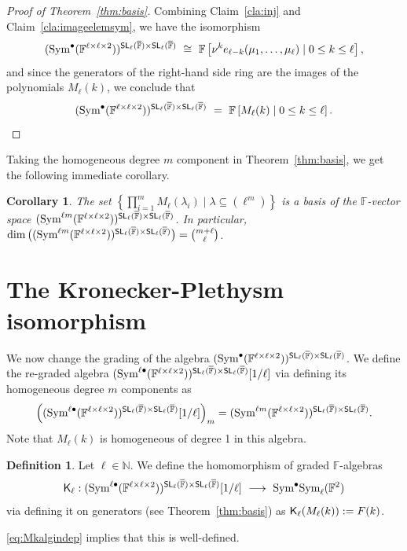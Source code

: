 \documentclass[a4paper]{extarticle}
\newcommand{\IN}{\mathbb{N}}
\newcommand{\IF}{\mathbb{F}}
\newcommand{\oIF}{{\overline{\mathbb{F}}}}
\newcommand{\SL}{\textsf{\textup{SL}}}
\newcommand{\Sym}{\textup{Sym}}
\newcommand{\KP}{\textsf{\textup{K}}}
\numberwithin{theorem}{section}
\newtheorem{corollary}[theorem]{Corollary}
\theoremstyle{definition}
\newtheorem{definition/}[theorem]{Definition}
\newenvironment{definition}
  {\renewcommand{\qedsymbol}{\scalebox{0.65}{$\blacksquare$}}
   \pushQED{\qed}\begin{definition/}}
  {\popQED\end{definition/}}
\begin{document}
\begin{proof}[Proof of Theorem~\ref{thm:basis}]
Combining Claim~\ref{cla:inj} and Claim~\ref{cla:imageelemsym}, we have the isomorphism
\[
(\Sym^{\bullet}(\IF^{\ell\times\ell\times2}))^{\SL_\ell(\oIF)\times \SL_\ell(\oIF)} \ \cong \  \IF\left[\nu^k e_{\ell-k}(\mu_1,\dots,\mu_\ell)\mid 0\leq k \leq \ell\right],
\]
and since the generators of the right-hand side ring are the images of the polynomials $M_\ell(k)$, we conclude that
\[
(\Sym^{\bullet}(\IF^{\ell\times\ell\times2}))^{\SL_\ell(\oIF)\times \SL_\ell(\oIF)}
 \ = \ 
\IF\left[M_\ell(k)\mid 0\leq k \leq \ell\right].
\qedhere
\]
\end{proof}

Taking the homogeneous degree $m$ component in Theorem~\ref{thm:basis}, we get the following immediate corollary.
\begin{corollary}
\label{cor:basiscount}
The set 
$
\left\{ \prod_{i=1}^m M_\ell(\lambda_i)\mid \lambda \subseteq (\ell^m) \right\}
$
is a basis of the
$\IF$-vector space $(\Sym^{\ell m}(\IF^{\ell\times\ell\times 2}))^{\SL_\ell(\oIF)\times \SL_\ell(\oIF)}$.
In particular, $\dim\big((\Sym^{\ell m}(\IF^{\ell\times\ell\times 2}))^{\SL_\ell(\oIF)\times \SL_\ell(\oIF)}\big) = \binom{m+\ell}{\ell}$.
\end{corollary}


\section{The Kronecker-Plethysm isomorphism}
We now change the grading of the algebra
$(\Sym^{\bullet}(\IF^{\ell\times\ell\times 2}))^{\SL_\ell(\oIF)\times \SL_\ell(\oIF)}$.
We define the re-graded algebra
$(\Sym^{\ell\bullet}(\IF^{\ell\times\ell\times 2}))^{\SL_\ell(\oIF)\times \SL_\ell(\oIF)}[1/\ell]$ via defining its homogeneous degree $m$ components as
\[
\left((\Sym^{\ell\bullet}(\IF^{\ell\times\ell\times 2}))^{\SL_\ell(\oIF)\times \SL_\ell(\oIF)}[1/\ell]\right)_m = (\Sym^{\ell m}(\IF^{\ell\times\ell\times 2}))^{\SL_\ell(\oIF)\times \SL_\ell(\oIF)}.
\]
Note that $M_\ell(k)$ is homogeneous of degree 1 in this algebra.

\begin{definition}
Let $\ell\in \IN$.
We define the homomorphism of graded $\IF$-algebras
\[
\KP_{\ell} :(\Sym^{\ell\bullet}(\IF^{\ell\times\ell\times 2}))^{\SL_\ell(\oIF)\times \SL_\ell(\oIF)}[1/\ell] \ \longrightarrow \ \Sym^\bullet \Sym_\ell(\IF^2)
\]
via defining it on generators (see Theorem~\ref{thm:basis}) as
$\KP_{\ell}(M_\ell(k)) := F(k)$.
\end{definition}
\eqref{eq:Mkalgindep} implies that this is well-defined.
\end{document}
